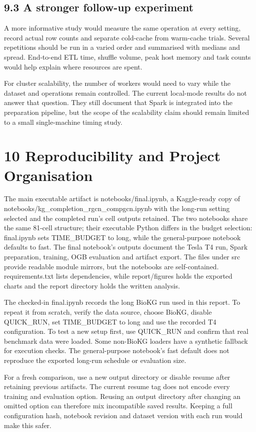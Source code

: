 \documentclass[11pt]{article}
\begin{document}
\subsection*{9.3 A stronger follow-up experiment}
A more informative study would measure the same operation at every setting, record actual row counts and separate cold-cache from warm-cache trials. Several repetitions should be run in a varied order and summarised with medians and spread. End-to-end ETL time, shuffle volume, peak host memory and task counts would help explain where resources are spent.

For cluster scalability, the number of workers would need to vary while the dataset and operations remain controlled. The current local-mode results do not answer that question. They still document that Spark is integrated into the preparation pipeline, but the scope of the scalability claim should remain limited to a small single-machine timing study.

\section*{10 Reproducibility and Project Organisation}
The main executable artifact is notebooks/final.ipynb, a Kaggle-ready copy of notebooks/kg\_completion\_rgcn\_compgcn.ipynb with the long-run setting selected and the completed run's cell outputs retained. The two notebooks share the same 81-cell structure; their executable Python differs in the budget selection: final.ipynb sets TIME\_BUDGET to long, while the general-purpose notebook defaults to fast. The final notebook's outputs document the Tesla T4 run, Spark preparation, training, OGB evaluation and artifact export. The files under src provide readable module mirrors, but the notebooks are self-contained. requirements.txt lists dependencies, while report/figures holds the exported charts and the report directory holds the written analysis.

The checked-in final.ipynb records the long BioKG run used in this report. To repeat it from scratch, verify the data source, choose BioKG, disable QUICK\_RUN, set TIME\_BUDGET to long and use the recorded T4 configuration. To test a new setup first, use QUICK\_RUN and confirm that real benchmark data were loaded. Some non-BioKG loaders have a synthetic fallback for execution checks. The general-purpose notebook's fast default does not reproduce the exported long-run schedule or evaluation size.

For a fresh comparison, use a new output directory or disable resume after retaining previous artifacts. The current resume tag does not encode every training and evaluation option. Reusing an output directory after changing an omitted option can therefore mix incompatible saved results. Keeping a full configuration hash, notebook revision and dataset version with each run would make this safer.
\end{document}
